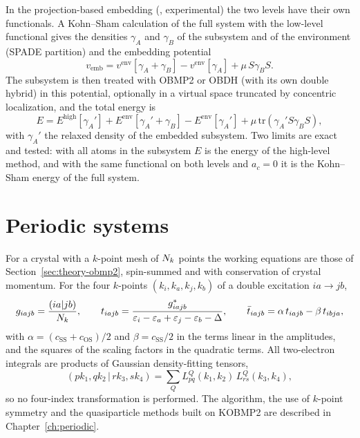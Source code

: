 In the projection-based embedding (, experimental) the two
levels have their own functionals. A Kohn--Sham calculation of the full
system with the low-level functional  gives the densities
$\gamma_A$ and $\gamma_B$ of the subsystem and of the environment (SPADE
partition) and the embedding potential
\begin{equation}
  v_{\mathrm{emb}} = v^{\mathrm{env}}[\gamma_A+\gamma_B]-v^{\mathrm{env}}[\gamma_A]
  +\mu\,S\gamma_BS .
\end{equation}
The subsystem is then treated with OBMP2 or OBDH (with its own double hybrid)
in this potential, optionally in a virtual space truncated by concentric
localization, and the total energy is
\begin{equation}
  E = E^{\mathrm{high}}[\gamma_A'] + E^{\mathrm{env}}[\gamma_A'+\gamma_B]
  -E^{\mathrm{env}}[\gamma_A'] + \mu\,\mathrm{tr}(\gamma_A'S\gamma_BS),
\end{equation}
with $\gamma_A'$ the relaxed density of the embedded subsystem. Two limits are
exact and tested: with all atoms in the subsystem $E$ is the energy of the
high-level method, and with the same functional on both levels and $a_c=0$ it
is the Kohn--Sham energy of the full system.

\section{Periodic systems}
\label{sec:theory-pbc}

For a crystal with a $k$-point mesh of $N_k$ points the working equations are
those of Section~\ref{sec:theory-obmp2}, spin-summed and with conservation
of crystal momentum. For the four $k$-points $(k_i,k_a,k_j,k_b)$ of a double
excitation $ia\to jb$,
\begin{equation}
  g_{iajb} = \frac{(ia|jb)}{N_k},\qquad
  t_{iajb} = \frac{g^*_{iajb}}{\varepsilon_i-\varepsilon_a+\varepsilon_j-\varepsilon_b-\Delta},\qquad
  \bar t_{iajb} = \alpha\,t_{iajb} - \beta\,t_{ibja},
\end{equation}
with $\alpha = (c_{\mathrm{SS}}+c_{\mathrm{OS}})/2$ and $\beta =
c_{\mathrm{SS}}/2$ in the terms linear in the amplitudes, and the squares of
the scaling factors in the quadratic terms. All two-electron integrals are
products of Gaussian density-fitting tensors,
\begin{equation}
  (p k_1, q k_2 \,|\, r k_3, s k_4) = \sum_Q L^Q_{pq}(k_1,k_2)\,L^Q_{rs}(k_3,k_4),
\end{equation}
so no four-index transformation is performed. The algorithm, the use of
$k$-point symmetry and the quasiparticle methods built on KOBMP2 are
described in Chapter~\ref{ch:periodic}.
